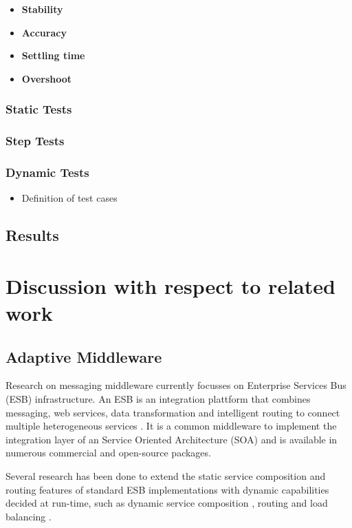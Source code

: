 \begin{itemize}
	\item \textbf{Stability}
	\item \textbf{Accuracy}
	\item \textbf{Settling time}
	\item \textbf{Overshoot}
\end{itemize}

\subsubsection{Static Tests}
\label{sec:ch05_static_tests}

\subsubsection{Step Tests}
\label{sec:ch05_step_tests}

\subsubsection{Dynamic Tests}

\begin{itemize}
	\item Definition of test cases
\end{itemize}

\subsection{Results}

\section{Discussion with respect to related work}\label{sec:ch5_related_work}
\subsection{Adaptive Middleware}
Research on messaging middleware currently focusses on Enterprise Services Bus (ESB) infrastructure. An ESB is an integration plattform that combines messaging, web services, data transformation and intelligent routing to connect multiple heterogeneous services \citep{Chappell:2004jo}. It is a common middleware to implement the integration layer of an Service Oriented Architecture (SOA) and is available in numerous commercial and open-source packages.

Several research has been done to extend the static service composition and routing features of standard ESB implementations with dynamic capabilities decided at run-time, such as dynamic service composition \citep{Chang:2007aa}, routing \citep{Bai:2007aa} \citep{Wu:2008aa} \citep{Ziyaeva:2008aa} and load balancing \citep{Jongtaveesataporn:2010aa}.

